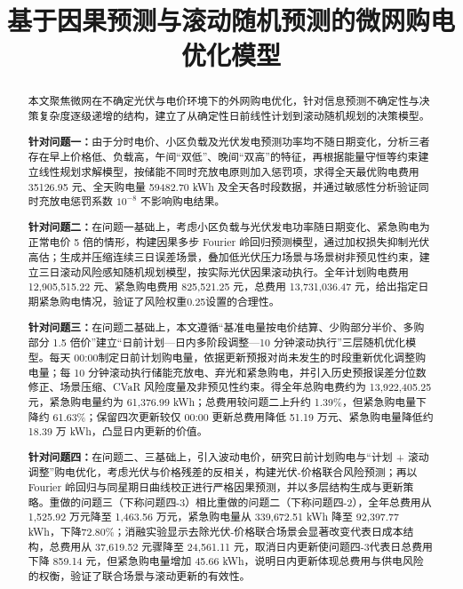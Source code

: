 \documentclass[withoutpreface,bwprint]{cumcmthesis} %
\title{基于因果预测与滚动随机预测的微网购电优化模型}
\begin{document}
\maketitle
\begin{abstract}

本文聚焦微网在不确定光伏与电价环境下的外网购电优化，针对信息预测不确定性与决策复杂度逐级递增的结构，建立了从确定性日前线性计划到滚动随机规划的决策模型。

\textbf{针对问题一：}由于分时电价、小区负载及光伏发电预测功率均不随日期变化，分析三者存在早上价格低、负载高，午间“双低”、晚间“双高”的特征，再根据能量守恒等约束建立线性规划求解模型，按储能不同时充放电原则加入惩罚项，求得全天最优购电费用 35126.95 元、全天购电量 59482.70 kWh 及全天各时段数据，并通过敏感性分析验证同时充放电惩罚系数 $10^{-8}$ 不影响购电结果。

\textbf{针对问题二：}在问题一基础上，考虑小区负载与光伏发电功率随日期变化、紧急购电为正常电价 5 倍的情形，构建因果多步 Fourier 岭回归预测模型，通过加权损失抑制光伏高估；生成并压缩连续三日误差场景，叠加低光伏压力场景与场景树非预见性约束，建立三日滚动风险感知随机规划模型，按实际光伏因果滚动执行。全年计划购电费用 12,905,515.22 元、紧急购电费用 825,521.25 元，总费用 13,731,036.47 元，给出指定日期紧急购电情况，验证了风险权重0.25设置的合理性。

\textbf{针对问题三：}在问题二基础上，本文遵循“基准电量按电价结算、少购部分半价、多购部分 1.5 倍价”建立“日前计划—日内多阶段调整—10 分钟滚动执行”三层随机优化模型。每天 00:00制定日前计划购电量，依据更新预报对尚未发生的时段重新优化调整购电量；每 10 分钟滚动执行储能充放电、弃光和紧急购电，并引入历史预报误差分位数修正、场景压缩、CVaR 风险度量及非预见性约束。得全年总购电费约为 13,922,405.25 元，紧急购电量约为 61,376.99 kWh；总费用较问题二上升约 1.39\%，但紧急购电量下降约 61.63\%；保留四次更新较仅 00:00 更新总费用降低 51.19 万元、紧急购电量降低约 18.39 万 kWh，凸显日内更新的价值。

\textbf{针对问题四：}在问题二、三基础上，引入波动电价，研究日前计划购电与“计划 + 滚动调整”购电优化，考虑光伏与价格残差的反相关，构建光伏-价格联合风险预测；再以 Fourier 岭回归与同星期日曲线校正进行严格因果预测，并以多层结构生成与更新策略。重做的问题三（下称问题四-3）相比重做的问题二（下称问题四-2），全年总费用从 1,525.92 万元降至 1,463.56 万元，紧急购电量从 339,672.51 kWh 降至 92,397.77 kWh，下降72.80\%；消融实验显示去除光伏-价格联合场景会显著改变代表日成本结构，总费用从 37,619.52 元骤降至 24,561.11 元，取消日内更新使问题四-3代表日总费用下降 859.14 元，但紧急购电量增加 45.66 kWh，说明日内更新体现总费用与供电风险的权衡，验证了联合场景与滚动更新的有效性。


\end{abstract}
\end{document}
